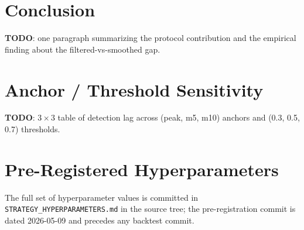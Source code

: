 \documentclass[11pt]{article}
\begin{document}
\section{Conclusion}
\label{sec:conclusion}

\textbf{TODO}: one paragraph summarizing the protocol contribution and the
empirical finding about the filtered-vs-smoothed gap.




\appendix

\section{Anchor / Threshold Sensitivity}
\label{appendix:sensitivity}
\textbf{TODO}: $3\times 3$ table of detection lag across (peak, m5, m10) anchors
and (0.3, 0.5, 0.7) thresholds.

\section{Pre-Registered Hyperparameters}
\label{appendix:hyperparameters}
The full set of hyperparameter values is committed in
\texttt{STRATEGY\_HYPERPARAMETERS.md} in the source tree; the pre-registration
commit is dated 2026-05-09 and precedes any backtest commit.
\end{document}

